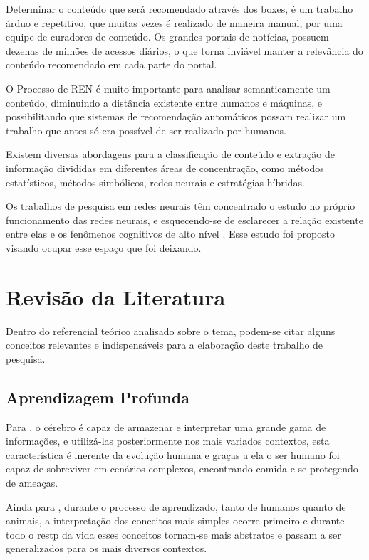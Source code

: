 \documentclass[12pt]{article}
\begin{document}
Determinar o conteúdo que será recomendado através dos boxes, é um trabalho árduo e repetitivo, que muitas vezes é realizado de maneira manual, por uma equipe de curadores de conteúdo. Os grandes portais de notícias, possuem dezenas de  milhões de acessos diários, o que torna inviável manter a relevância do conteúdo recomendado em cada parte do portal. 

O Processo de REN é muito importante para analisar semanticamente um conteúdo, diminuindo a distância existente entre humanos e máquinas, e possibilitando que sistemas de recomendação automáticos possam realizar um trabalho que antes só era possível de ser realizado por humanos. 

Existem diversas abordagens para a classificação de conteúdo e extração de informação divididas em diferentes áreas de concentração, como métodos estatísticos, métodos simbólicos, redes neurais e estratégias híbridas.

Os trabalhos de pesquisa em redes neurais têm concentrado o estudo no próprio funcionamento das redes neurais, e esquecendo-se de esclarecer a relação existente entre elas e os fenômenos cognitivos de alto nível \cite{DanielMuller2015}. Esse estudo foi proposto visando ocupar esse espaço que foi deixando.

\section{Revisão da Literatura}
Dentro do referencial teórico analisado sobre o tema, podem-se citar alguns conceitos relevantes e indispensáveis para a elaboração deste trabalho de pesquisa.

\subsection{Aprendizagem Profunda}
Para \cite{Fernades2013}, o cérebro é capaz de armazenar e interpretar uma grande gama de informações, e utilizá-las posteriormente nos mais variados contextos, esta característica é inerente da evolução humana e graças a ela o ser humano foi capaz de sobreviver em cenários complexos, encontrando comida e se protegendo de ameaças.

Ainda para \cite{Fernades2013}, durante o processo de aprendizado, tanto de humanos quanto de animais, a interpretação dos conceitos mais simples ocorre primeiro e durante todo o restp da vida esses conceitos tornam-se mais abstratos e passam a ser generalizados para os mais diversos contextos.
\end{document}
